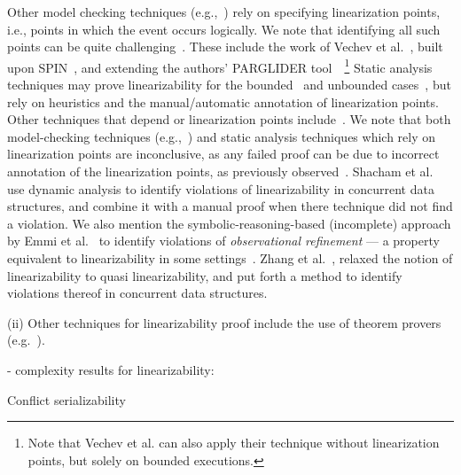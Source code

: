 Other model checking techniques (e.g.,~\cite{Fl04}) rely on specifying linearization points, i.e., points in which the event occurs logically. We note that identifying all such points can be quite challenging~\cite{VeYaYo09}.
%
These include the work of Vechev et al.~\cite{VeYaYo09}, built upon SPIN~\cite{Ho97}, and extending the authors' PARGLIDER tool~\cite{VeYa08}~\footnote{Note that Vechev et al. can also apply their technique without linearization points, but solely on bounded executions.}
%
Static analysis techniques may prove linearizability for the 
bounded~\cite{AmRiReSaYa07} and unbounded cases~\cite{BeLeMaRaSa08, Va09, 
Va10}, but rely on heuristics and the manual/automatic annotation of 
linearization points. Other techniques that depend or linearization points 
include~\cite{OhRiVeYaYo10, ZhPeHa15, AbJoTr16}. 
%
We note that both model-checking techniques (e.g.,~\cite{CeRaZuChAl10}) and static analysis techniques which rely on linearization points are inconclusive, as any failed proof can be due to incorrect annotation of the linearization points, as previously observed~\cite{BoEmCoHa15}.
%
Shacham et al.~\cite{ShBrAiSaVeYa11} use dynamic analysis to identify violations of linearizability in concurrent data structures, and combine it with a manual proof when there technique did not find a violation.
%
We also mention the symbolic-reasoning-based (incomplete) approach by Emmi et al.~\cite{EmEnHa15} to identify violations of \textit{observational refinement} --- a property equivalent to linearizability in some settings~\cite{FiOhRiYa10, BoEmCoHa15}.
%
Zhang et al.~\cite{ZhChWa13}, relaxed the notion of linearizability to quasi linearizability, and put forth a method to identify violations thereof in concurrent data structures.







(ii) Other techniques for linearizability proof include the use of theorem provers (e.g.~\cite{CoDoGr05, DeScWe11}).


- complexity results for linearizability:

Conflict serializability

